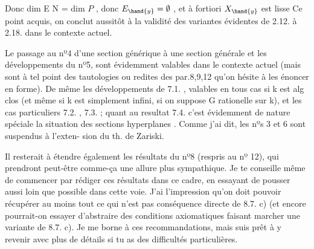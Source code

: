
Donc dim E \hand{$<$} N = dim $P$ , donc $E_{\hand{y}} = \emptyset$ , et à fortiori $X_{\hand{y}}$ est lisse
Ce point acquis, on conclut aussitôt à la validité des variantes
évidentes de 2.12. à 2.18. dans le contexte actuel.

Le passage au nº4 d'une section générique à une section générale
et les développements du nº5, sont évidemment valables dans le contexte
actuel (mais sont à tel point des tautologies ou redites des
par.8,9,12  qu'on hésite à les énoncer en forme). De même les
développements de 7.1. , valables en tous cas si k est  alg clos
(et même si k est simplement infini, si on suppose G rationelle sur k),
et les cas particuliers 7.2. , 7.3. ; quant au resultat 7.4. 
c'est évidemment  de nature spéciale   la situation des sections
hyperplanes . Comme j'ai dit, les nºs 3 et 6 sont suspendus à l'exten-%
sion du th. de Zariski.

Il resterait à étendre également les résultats du nº8 (respris au
nº 12), qui prendront peut-être comme-ça une allure plus sympathique.
Je te conseille même de commencer par rédiger ces résultats dans ce cadre,
en essayant de pousser aussi loin que possible dans cette voie. J'ai
l'impression qu'on doit pouvoir récupérer au moins tout ce qui n'est pas
conséquence directe de 8.7. c) (et encore pourrait-on essayer
d'abstraire des conditions axiomatiques faisant marcher une variante de
8.7. c). Je me borne à ces recommandations, mais suis prêt à y revenir
avec plus de détails si tu as des difficultés particulières.

